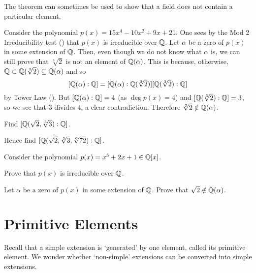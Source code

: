The theorem can sometimes be used to show that a field does not contain a particular element.

\begin{example}
    Consider the polynomial $p(x) = 15x^4 - 10x^2 + 9x + 21$. One sees by the Mod 2 Irreducibility test () that $p(x)$ is irreducible over $\mathbb{Q}$. Let $\alpha$ be a zero of $p(x)$ in some extension of $\mathbb{Q}$. Then, even though we do not know what $\alpha$ is, we can still prove that $\sqrt[3]2$ is not an element of $\mathbb{Q}(\alpha)$. This is because, otherwise, $\mathbb{Q} \subset \mathbb{Q}(\sqrt[3]2) \subseteq \mathbb{Q}(\alpha)$ and so
    \[
        [\mathbb{Q}(\alpha):\mathbb{Q}] = [\mathbb{Q}(\alpha):\mathbb{Q}(\sqrt[3]2)][\mathbb{Q}(\sqrt[3]2):\mathbb{Q}]
    \]
    by Tower Law (). But $[\mathbb{Q}(\alpha):\mathbb{Q}] = 4$ (as $\deg p(x) = 4$) and $[\mathbb{Q}(\sqrt[3]2):\mathbb{Q}] = 3$, so we see that 3 divides 4, a clear contradiction. Therefore $\sqrt[3]2 \notin \mathbb{Q}(\alpha)$.
\end{example}

\begin{exercise}
    \hfill
    \begin{partquestions}{\alph*}
        \item \begin{partquestions}{\roman*}
            \item Find $[\mathbb{Q}(\sqrt2,\sqrt[3]3):\mathbb{Q}]$.
            \item Hence find $[\mathbb{Q}(\sqrt2, \sqrt[3]3, \sqrt[6]{72}):\mathbb{Q}]$.
        \end{partquestions}
        \item Consider the polynomial $p(x) = x^5 + 2x + 1 \in \mathbb{Q}[x]$.
        \begin{partquestions}{\roman*}
            \item Prove that $p(x)$ is irreducible over $\mathbb{Q}$.
            \item Let $\alpha$ be a zero of $p(x)$ in some extension of $\mathbb{Q}$. Prove that $\sqrt2 \notin \mathbb{Q}(\alpha)$.
        \end{partquestions}
    \end{partquestions}
\end{exercise}

\section{Primitive Elements}
Recall that a simple extension is `generated' by one element, called its primitive element. We wonder whether `non-simple' extensions can be converted into simple extensions.


